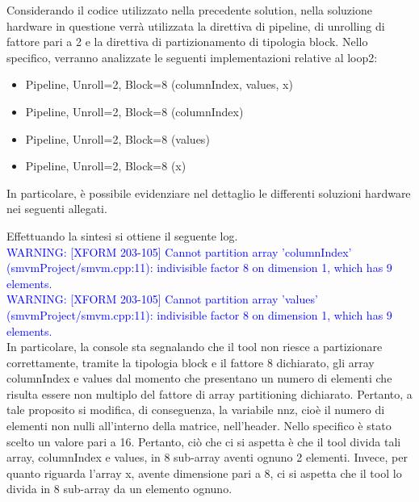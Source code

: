 Considerando il codice utilizzato nella precedente solution, nella soluzione hardware in questione verrà utilizzata la direttiva di pipeline, di unrolling di fattore pari a 2 e la direttiva di partizionamento di tipologia block. Nello specifico, verranno analizzate le seguenti implementazioni relative al loop2:
\begin{itemize}
	\item Pipeline, Unroll=2, Block=8 (columnIndex, values, x)
	\item Pipeline, Unroll=2, Block=8 (columnIndex)
	\item Pipeline, Unroll=2, Block=8 (values)
	\item Pipeline, Unroll=2, Block=8 (x)
\end{itemize}

In particolare, è possibile evidenziare nel dettaglio le differenti soluzioni hardware nei seguenti allegati.






Effettuando la sintesi si ottiene il seguente log.
\\
\textcolor{blue}{WARNING: [XFORM 203-105] Cannot partition array 'columnIndex' (smvmProject/smvm.cpp:11): indivisible factor 8 on dimension 1, which has 9 elements.}
\\
\textcolor{blue}{WARNING: [XFORM 203-105] Cannot partition array 'values' (smvmProject/smvm.cpp:11): indivisible factor 8 on dimension 1, which has 9 elements.}
\\
In particolare, la console sta segnalando che il tool non riesce a partizionare correttamente, tramite la tipologia block e il fattore 8 dichiarato, gli array columnIndex e values dal momento che presentano un numero di elementi che risulta essere non multiplo del fattore di array partitioning dichiarato. Pertanto, a tale proposito si modifica, di conseguenza, la variabile nnz, cioè il numero di elementi non nulli all'interno della matrice, nell'header. Nello specifico è stato scelto un valore pari a 16. Pertanto, ciò che ci si aspetta è che il tool divida tali array, columnIndex e values, in 8 sub-array aventi ognuno 2 elementi. Invece, per quanto riguarda l'array x, avente dimensione pari a 8, ci si aspetta che il tool lo divida in 8 sub-array da un elemento ognuno.



